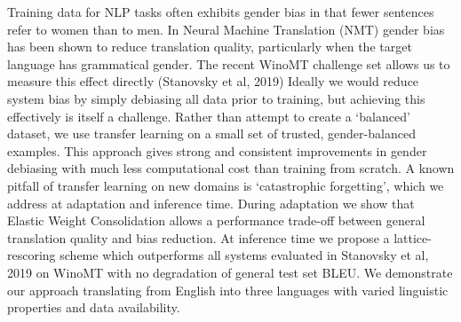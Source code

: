 Training data for NLP tasks often exhibits gender bias in that fewer sentences refer to women than to men. In Neural Machine Translation (NMT) gender bias has been shown to reduce translation quality, particularly when the target language has grammatical gender. The recent WinoMT challenge set allows us to measure this effect directly (Stanovsky et al, 2019) Ideally we would reduce system bias by simply debiasing all data prior to training, but achieving this effectively is itself a challenge. Rather than attempt to create a `balanced' dataset, we use transfer learning on a small set of trusted, gender-balanced examples. This approach gives strong and consistent improvements in gender debiasing with much less computational cost than training from scratch. A known pitfall of transfer learning on new domains is `catastrophic forgetting', which we address at adaptation and inference time. During adaptation we show that Elastic Weight Consolidation allows a performance trade-off between general translation quality and bias reduction. At inference time we propose a lattice-rescoring scheme which outperforms all systems evaluated in  Stanovsky et al, 2019 on WinoMT with no degradation of general test set BLEU. We demonstrate our approach translating from English into three languages with varied linguistic properties and data availability.
